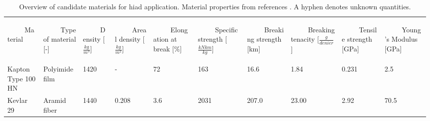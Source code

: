 \begin{table}[H]
\caption[Overview of candidate materials for \gls{hiad} application]{Overview of candidate materials for \gls{hiad} application. Material properties from references \cite{Samareh2011,Miller2014}. A hyphen denotes unknown quantities.}
\vspace{41mm}
\hspace{-10mm}
\begin{tabular}{p{}|p{}|p{}|p{}|p{}|p{}|p{}|p{}|p{}|p{}}
\begin{rotate}{60} ~~~~~Material \end{rotate}  &  \begin{rotate}{60} ~~~~~Type of material {[}-{]}  \end{rotate} & \begin{rotate}{60} ~~~~~Density [$\frac{kg}{m^3}$] \end{rotate}& \begin{rotate}{60} ~~~~~Areal density [$\frac{kg}{m^2}$] \end{rotate} & \begin{rotate}{60} ~~~~~Elongation at break [$\%$] \end{rotate} & \begin{rotate}{60} ~~~~~Specific strength [$\frac{kN km}{kg}$]\end{rotate} &  \begin{rotate}{60} ~~~~~Breaking strength [km]\end{rotate} & \begin{rotate}{60} ~~~~~Breaking tenacity [$\frac{g}{denier}$]\end{rotate}&  \begin{rotate}{60} ~~~~~Tensile strength [GPa] \end{rotate} & \begin{rotate}{60} ~~~~~Young's Modulus [GPa] \end{rotate}  \\
Kapton Type 100 HN           & Polyimide film               & 1420                                 & -                                          & 72                           & 163                              & 16.6                       & 1.84                             & 0.231                      & 2.5                                 \\ \hline
Kevlar 29     & Aramid fiber                 & 1440                                 & 0.208                                     & 3.6                          & 2031                             & 207.0                      & 23.00                            & 2.92                       & 70.5                                      \\ \hline

\end{tabular}
\end{table}

